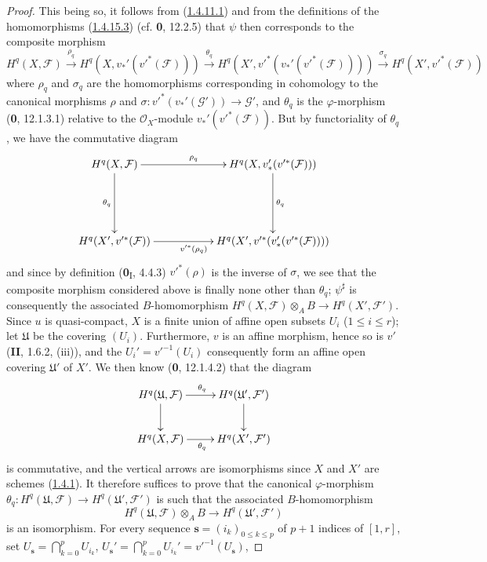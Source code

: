 \begin{proof}
This being so, it follows from
(\hyperref[III.1.4.11.1]{1.4.11.1}) and from the definitions of the
homomorphisms (\hyperref[III.1.4.15.3]{1.4.15.3})
(cf. \textbf{0}, 12.2.5) that $\psi$ then corresponds to the composite morphism
\[
H^q(X,\mathcal F)\xrightarrow{\rho_q}
H^q(X,v_*'(v'^*(\mathcal F)))\xrightarrow{\theta_q}
H^q(X',v'^*(v_*'(v'^*(\mathcal F))))\xrightarrow{\sigma_q}
H^q(X',v'^*(\mathcal F))
\]
where $\rho_q$ and $\sigma_q$ are the homomorphisms corresponding in
cohomology to the canonical morphisms $\rho$ and
$\sigma:v'^*(v_*'(\mathcal G'))\to\mathcal G'$, and $\theta_q$ is the
$\varphi$-morphism (\textbf{0}, 12.1.3.1) relative to the $\mathcal O_X$-module
$v_*'(v'^*(\mathcal F))$. But by functoriality of $\theta_q$, we have the
commutative diagram
\[
\xymatrix{
H^q(X,\mathcal F)\ar[rr]^{\rho_q}\ar[dd]_{\theta_q}
&&H^q(X,v_*'(v'^*(\mathcal F)))\ar[dd]^{\theta_q}\\\\
H^q(X',v'^*(\mathcal F))\ar[rr]_{v'^*(\rho_q)}
&&H^q(X',v'^*(v_*'(v'^*(\mathcal F))))
}
\]
and since by definition (\textbf{0}\textsubscript{I}, 4.4.3) $v'^*(\rho)$ is
the inverse of $\sigma$, we see that the composite morphism considered above
is finally none other than $\theta_q$; $\psi^\sharp$ is consequently the
associated $B$-homomorphism $H^q(X,\mathcal F)\otimes_A B\longrightarrow H^q(X',\mathcal F')$.
Since $u$ is quasi-compact, $X$ is a finite union of affine open subsets $U_i$
($1\leq i\leq r$); let $\mathfrak U$ be the covering $(U_i)$. Furthermore,
$v$ is an affine morphism, hence so is $v'$ (\textbf{II}, 1.6.2,
(iii)), and the $U_i'=v'^{-1}(U_i)$ consequently form an affine open
covering $\mathfrak U'$ of $X'$. We then know (\textbf{0}, 12.1.4.2) that the diagram
\[
\xymatrix{
H^q(\mathfrak U,\mathcal F)\ar[r]^{\theta_q}\ar[d]
&H^q(\mathfrak U',\mathcal F')\ar[d]\\
H^q(X,\mathcal F)\ar[r]_{\theta_q}&H^q(X',\mathcal F')
}
\]
is commutative, and the vertical arrows are isomorphisms since
$X$ and $X'$ are schemes (\hyperref[III.1.4.1]{1.4.1}). It therefore
suffices to prove that the canonical $\varphi$-morphism
$\theta_q:H^q(\mathfrak U,\mathcal F)\to H^q(\mathfrak U',\mathcal F')$
is such that the associated $B$-homomorphism
\[
H^q(\mathfrak U,\mathcal F)\otimes_A B
\longrightarrow H^q(\mathfrak U',\mathcal F')
\]
is an isomorphism. For every sequence
$\mathbf s=(i_k)_{0\leq k\leq p}$ of $p+1$ indices of $[1,r]$, set $U_{\mathbf s}=\bigcap\limits_{k=0}^pU_{i_k}$,\quad
$U_{\mathbf s}'=\bigcap\limits_{k=0}^pU_{i_k}'=v'^{-1}(U_{\mathbf s})$,\quad

\end{proof}
